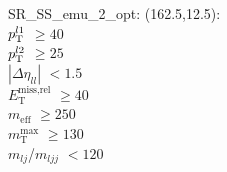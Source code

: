 SR\_SS\_emu\_2\_opt: (162.5,12.5): \\
$p_{\text{T}}^{l1}$ $\geq 40$ \\
$p_{\text{T}}^{l2}$ $\geq 25$ \\
$|\Delta\eta_{ll}|$ $<1.5$ \\
$E_{\text{T}}^{\text{miss,rel}}$ $\geq 40$ \\
$m_{\text{eff}}$ $\geq 250$ \\
$m_{\text{T}}^{\text{max}}$ $\geq 130$ \\
$m_{lj}$/$m_{ljj}$ $<120$ \\
